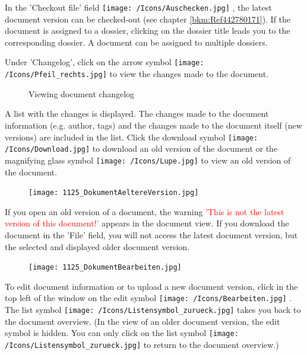 In the 'Checkout file' field \texttt{[image: /Icons/Auschecken.jpg]} , the latest document version can be checked-out (see chapter \ref{bkm:Ref442780171}). If the document is assigned to a dossier, clicking on the dossier title  leads you to the corresponding dossier. A document can be assigned to multiple dossiers. \newline 

\vspace{\baselineskip}

Under 'Changelog', click on the arrow symbol \texttt{[image: /Icons/Pfeil\_rechts.jpg]}  to view the changes made to the document.

\begin{figure}[H]
\caption{Viewing document changelog}
\end{figure}

A list with the changes is displayed. The changes made to the document information (e.g. author, tags) and the changes made to the document itself (new versions) are included in the list. Click the download symbol \texttt{[image: /Icons/Download.jpg]}  to download an old version of the document or the magnifying glass symbol \texttt{[image: /Icons/Lupe.jpg]}  to view an old version of the document. \newline

\begin{figure}
\vspace{-15pt}
\texttt{[image: 1125\_DokumentAeltereVersion.jpg]}
\end{figure}
If you open an old version of a document, the warning \textcolor{red}{'This is not the latest version of this document!'} appears in the document view. If you download the document in the 'File' field, you will not access the latest document version, but the selected and displayed older document version.

\begin{figure}
\texttt{[image: 1125\_DokumentBearbeiten.jpg]}
\end{figure}
To edit document information or to upload a new document version, click in the top left of the window on the edit symbol \texttt{[image: /Icons/Bearbeiten.jpg]} . The list symbol \texttt{[image: /Icons/Listensymbol\_zurueck.jpg]}  takes you back to the document overview. (In the view of an older document version, the edit symbol is hidden. You can only click on the list symbol \texttt{[image: /Icons/Listensymbol\_zurueck.jpg]} to return to the document overview.)

